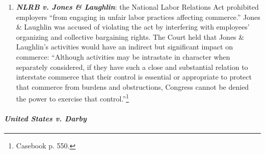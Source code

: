 \begin{enumerate}
    \item \emph{\textbf{NLRB v. Jones \& Laughlin}}: the National Labor 
    Relations Act prohibited employers ``from engaging in unfair labor 
    practices affecting commerce.'' Jones \& Laughlin was accused of violating 
    the act by interfering with employees' organizing and collective 
    bargaining rights. The Court held that Jones \& Laughlin's activities 
    would have an indirect but significant impact on commerce: ``Although 
    activities may be intrastate in character when separately considered, if 
    they have such a close and substantial relation to interstate commerce 
    that their control is essential or appropriate to protect that commerce 
    from burdens and obstructions, Congress cannot be denied the power to 
    exercise that control.''\footnote{Casebook p. 550.}
\end{enumerate}

\paragraph{\emph{United States v. Darby}}

